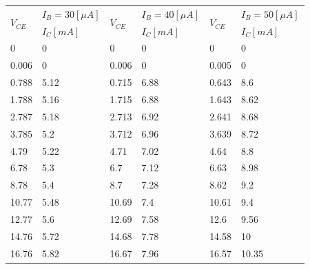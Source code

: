 \documentclass[10pt, a4j, dvipdfmx]{jarticle}
\begin{document}
    \begin{table}[H]
        \centering
        \begin{tabular}{|l|l||l|l||l|l|}
        \hline
        \multirow{2}{*}{$V_{CE}$} & $I_B=30[\mu A]$ & \multirow{2}{*}{$V_{CE}$} & $I_B=40[\mu A]$ & \multirow{2}{*}{$V_{CE}$} & $I_B=50[\mu A]$ \\ \cline{2-2} \cline{4-4} \cline{6-6} 
        & $I_C[mA]$       &                           & $I_C[mA]$       &                           & $I_C[mA]$       \\ \hline
        0                         & 0               & 0                         & 0               & 0                         & 0               \\ \hline
        0.006                     & 0               & 0.006                     & 0               & 0.005                     & 0               \\ \hline
        0.788                     & 5.12            & 0.715                     & 6.88            & 0.643                     & 8.6             \\ \hline
        1.788                     & 5.16            & 1.715                     & 6.88            & 1.643                     & 8.62            \\ \hline
        2.787                     & 5.18            & 2.713                     & 6.92            & 2.641                     & 8.68            \\ \hline
        3.785                     & 5.2             & 3.712                     & 6.96            & 3.639                     & 8.72            \\ \hline
        4.79                      & 5.22            & 4.71                      & 7.02            & 4.64                      & 8.8             \\ \hline
        6.78                      & 5.3             & 6.7                       & 7.12            & 6.63                      & 8.98            \\ \hline
        8.78                      & 5.4             & 8.7                       & 7.28            & 8.62                      & 9.2             \\ \hline
        10.77                     & 5.48            & 10.69                     & 7.4             & 10.61                     & 9.4             \\ \hline
        12.77                     & 5.6             & 12.69                     & 7.58            & 12.6                      & 9.56            \\ \hline
        14.76                     & 5.72            & 14.68                     & 7.78            & 14.58                     & 10              \\ \hline
        16.76                     & 5.82            & 16.67                     & 7.96            & 16.57                     & 10.35           \\ \hline
        \end{tabular}
    \end{table}
\end{document}
